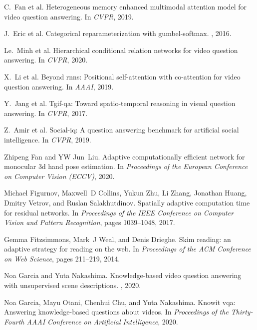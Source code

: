 \documentclass[final]{cvpr}
\begin{document}
{\begin{thebibliography}{10}
C.~Fan et al.
\newblock Heterogeneous memory enhanced multimodal attention model for video
  question answering.
\newblock In {\em CVPR}, 2019.

J.~Eric et al.
\newblock Categorical reparameterization with gumbel-softmax.
, 2016.

Le.~Minh et al.
\newblock Hierarchical conditional relation networks for video question
  answering.
\newblock In {\em CVPR}, 2020.

X.~Li et al.
\newblock Beyond rnns: Positional self-attention with co-attention for video
  question answering.
\newblock In {\em AAAI}, 2019.

Y.~Jang et al.
\newblock Tgif-qa: Toward spatio-temporal reasoning in visual question
  answering.
\newblock In {\em CVPR}, 2017.

Z.~Amir et al.
\newblock Social-iq: A question answering benchmark for artificial social
  intelligence.
\newblock In {\em CVPR}, 2019.

Zhipeng Fan and YW Jun~Liu.
\newblock Adaptive computationally efficient network for monocular 3d hand pose
  estimation.
\newblock In {\em Proceedings of the European Conference on Computer Vision
  (ECCV)}, 2020.

Michael Figurnov, Maxwell~D Collins, Yukun Zhu, Li Zhang, Jonathan Huang,
  Dmitry Vetrov, and Ruslan Salakhutdinov.
\newblock Spatially adaptive computation time for residual networks.
\newblock In {\em Proceedings of the IEEE Conference on Computer Vision and
  Pattern Recognition}, pages 1039--1048, 2017.

Gemma Fitzsimmons, Mark~J Weal, and Denis Drieghe.
\newblock Skim reading: an adaptive strategy for reading on the web.
\newblock In {\em Proceedings of the ACM Conference on Web Science}, pages
  211--219, 2014.

Noa Garcia and Yuta Nakashima.
\newblock Knowledge-based video question answering with unsupervised scene
  descriptions.
, 2020.

Noa Garcia, Mayu Otani, Chenhui Chu, and Yuta Nakashima.
\newblock Knowit vqa: Answering knowledge-based questions about videos.
\newblock In {\em Proceedings of the Thirty-Fourth AAAI Conference on
  Artificial Intelligence}, 2020.


\end{thebibliography}}
\end{document}
